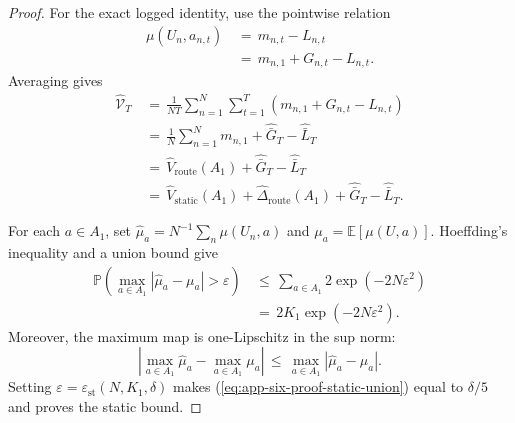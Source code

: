 \documentclass{article} %
\renewcommand{\eqref}[1]{\textup{(\ref{#1})}}
\begin{document}
\begin{proof}
For the exact logged identity, use the pointwise relation
\begin{equation}
\label{eq:app-six-proof-sample-pointwise}
\begin{aligned}
\mu(U_n,a_{n,t})
&\,=\,
m_{n,t}-L_{n,t}
\\
&\,=\,
m_{n,1}+G_{n,t}-L_{n,t}.
\end{aligned}
\end{equation}
Averaging gives
\begin{equation}
\label{eq:app-six-proof-sample-average}
\begin{aligned}
\widehat{\mathcal{V}}_T
&\,=\,
\frac{1}{NT}\sum_{n=1}^{N}\sum_{t=1}^{T}
\left(m_{n,1}+G_{n,t}-L_{n,t}\right)
\\
&\,=\,
\frac{1}{N}\sum_{n=1}^{N}m_{n,1}
+
\widehat{\bar G}_T
-
\widehat{\bar L}_T
\\
&\,=\,
\widehat V_{\mathrm{route}}(A_1)
+
\widehat{\bar G}_T
-
\widehat{\bar L}_T
\\
&\,=\,
\widehat V_{\mathrm{static}}(A_1)
+
\widehat\Delta_{\mathrm{route}}(A_1)
+
\widehat{\bar G}_T
-
\widehat{\bar L}_T.
\end{aligned}
\end{equation}

For each \(a\in A_1\), set
\(\widehat\mu_a=N^{-1}\sum_n\mu(U_n,a)\) and
\(\mu_a=\mathbb E[\mu(U,a)]\). Hoeffding's inequality and a union bound give
\begin{equation}
\label{eq:app-six-proof-static-union}
\begin{aligned}
\mathbb{P}\!\left(
\max_{a\in A_1}|\widehat\mu_a-\mu_a|>\varepsilon
\right)
&\,\le\,
\sum_{a\in A_1}
2\exp(-2N\varepsilon^2)
\\
&\,=\,
2K_1\exp(-2N\varepsilon^2).
\end{aligned}
\end{equation}
Moreover, the maximum map is one-Lipschitz in the sup norm:
\begin{equation}
\left|
\max_{a\in A_1}\widehat\mu_a
-
\max_{a\in A_1}\mu_a
\right|
\,\leq\,
\max_{a\in A_1}|\widehat\mu_a-\mu_a|.
\end{equation}
Setting \(\varepsilon=\varepsilon_{\mathrm{st}}(N,K_1,\delta)\) makes
\eqref{eq:app-six-proof-static-union} equal to \(\delta/5\) and proves the
static bound.


\end{proof}
\end{document}
